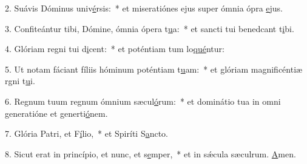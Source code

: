 2. Suávis Dóminus univ\uline{é}rsis:~* et miseratiónes ejus super ómnia ópra \uline{e}jus.\par 
3. Confiteántur tibi, Dómine, ómnia ópera t\uline{u}a:~* et sancti tui benedcant t\uline{i}bi.\par 
4. Glóriam regni tui d\uline{i}cent:~* et poténtiam tum lo\uline{qué}ntur:\par 
5. Ut notam fáciant fíliis hóminum poténtiam t\uline{u}am:~* et glóriam magnificéntiæ rgni t\uline{u}i.\par 
6. Regnum tuum regnum ómnium sæcul\uline{ó}rum:~* et dominátio tua in omni generatióne et generti\uline{ó}nem.\par 
7. Glória Patri, et F\uline{í}lio,~* et Spiríti S\uline{a}ncto.\par 
8. Sicut erat in princípio, et nunc, et s\uline{e}mper,~* et in sǽcula sæculrum. \uline{A}men.\par 
